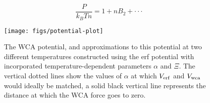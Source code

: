 \documentclass[letterpaper,twocolumn,amsmath,amssymb,prb]{revtex4-1}
\newcommand\kirstiesays[1]{{\bf \color{red}K: #1}}
\begin{document}
\begin{equation}\frac{P}{k_BTn}=1+nB_2+ \cdot\cdot\cdot \end{equation}  %

\begin{figure}
\begin{center}
\texttt{[image: figs/potential-plot]}
\end{center}
\caption{The WCA potential, 
   and approximations to this potential
   at two different temperatures constructed using the erf potential 
   with incorporated temperature-dependent parameters $\alpha$ and $\Xi$. 
   The vertical dotted lines show the values of $\alpha$ at
   which $V_{\mathrm{erf}}$ and $V_{\mathrm{wca}}$ would ideally be matched, a solid black vertical 
   line represents the distance at which the WCA force goes to zero. }
\label{fig:potential-plot}
\end{figure}
\end{document}
